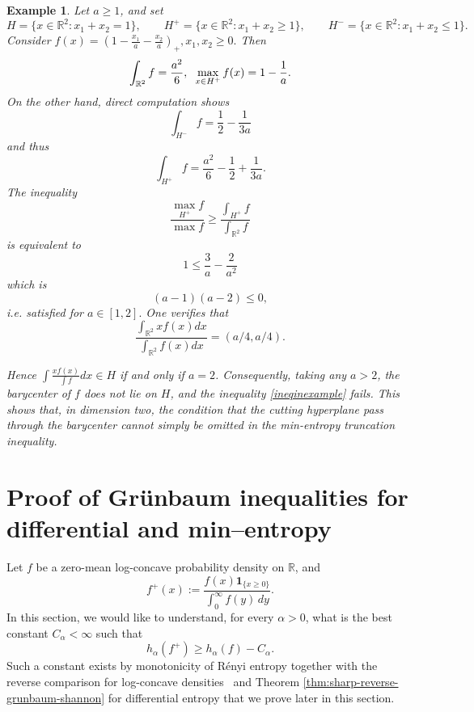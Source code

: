 \documentclass{article}
\theoremstyle{plain}
\newtheorem{example}[theorem]{Example}
\theoremstyle{definition}
\newcommand{\1}{\mathbf 1}
\begin{document}
\begin{example} \label{counterexample}
Let \(a\geq1\), and set
\[
H=\{x\in\mathbb R^2:x_1+x_2=1\},\qquad
H^+=\{x\in\mathbb R^2:x_1+x_2\ge 1\},
\qquad
H^-=\{x\in\mathbb R^2:x_1+x_2\le 1\}.
\]
Consider $f(x) = (1-\frac{x_1}{a}-\frac{x_2}{a})_+, x_1,x_2 \geq 0.$ Then 
$$
\int_{\mathbb{R}^2} f = \frac{a^2}{6},\hspace{0.2cm} \max_{x \in H^+}f(x) = 1-\frac{1}{a}.
$$
On the other hand, direct computation shows 
$$
\int_{H^-}f = \frac{1}{2}-\frac{1}{3a}
$$
and thus
$$
\int_{H^+}f = \frac{a^2}{6}-\frac12+\frac1{3a}.
$$
The inequality 
\begin{equation} \label{ineqinexample}
\frac{\max_{H^+}f}{\max f} \geq \frac{\int_{H^+}f}{\int_{\mathbb{R}^2} f}
\end{equation}
is equivalent to 
$$
1 \leq \frac3{a}-\frac2{a^2}
$$
which is 
$$
(a-1)(a-2) \leq 0,
$$
i.e. satisfied for $a \in [1,2].$
One verifies that
$$
\frac{\int_{\mathbb{R}^2} xf(x)dx}{\int_{\mathbb{R}^2} f(x)dx} = (a/4,a/4).
$$

Hence $\int \frac{xf(x)}{\int f} dx \in H$ if and only if $a=2$. Consequently, taking any \(a>2\), the barycenter of \(f\) does not lie on \(H\), and the inequality
\eqref{ineqinexample} fails. This shows that, in dimension two, the condition that the cutting hyperplane pass through the barycenter cannot simply be omitted in the min-entropy truncation inequality.


\end{example}


\section{Proof of Gr\"unbaum inequalities for differential and min--entropy}
\label{grunbaumSec}

Let $f$ be a zero-mean log-concave probability density on $\mathbb R$,
and 
\[
        f^+(x):=
        \frac{f(x)\mathbf 1_{\{x\ge 0\}}}{\int_0^\infty f(y)\,dy}.
\]
In this section, we would like to understand, for every $\alpha>0$, what is the best 
constant $C_\alpha<\infty$ such that
\[
        h_\alpha(f^+) \ge h_\alpha(f)-C_\alpha .
\]
Such a constant exists by monotonicity of R{\'e}nyi entropy together with the reverse comparison for log-concave densities~\cite{fradelizilimadiman} and Theorem \ref{thm:sharp-reverse-grunbaum-shannon} for differential entropy that we prove later in this section. 
\end{document}
